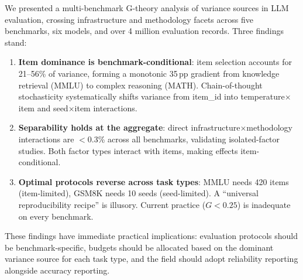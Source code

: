 \documentclass[11pt]{article}
\newcommand{\pp}{\,\text{pp}}
\begin{document}
We presented a multi-benchmark G-theory analysis of variance sources in LLM evaluation, crossing infrastructure and methodology facets across five benchmarks, six models, and over 4 million evaluation records. Three findings stand:

\begin{enumerate}
\item \textbf{Item dominance is benchmark-conditional}: item selection accounts for 21--56\% of variance, forming a monotonic 35$\pp$ gradient from knowledge retrieval (MMLU) to complex reasoning (MATH). Chain-of-thought stochasticity systematically shifts variance from item\_id into temperature$\times$item and seed$\times$item interactions.

\item \textbf{Separability holds at the aggregate}: direct infrastructure$\times$methodology interactions are $<$0.3\% across all benchmarks, validating isolated-factor studies. Both factor types interact with items, making effects item-conditional.

\item \textbf{Optimal protocols reverse across task types}: MMLU needs 420 items (item-limited), GSM8K needs 10 seeds (seed-limited). A ``universal reproducibility recipe'' is illusory. Current practice ($G < 0.25$) is inadequate on every benchmark.
\end{enumerate}

These findings have immediate practical implications: evaluation protocols should be benchmark-specific, budgets should be allocated based on the dominant variance source for each task type, and the field should adopt reliability reporting alongside accuracy reporting.
\end{document}
